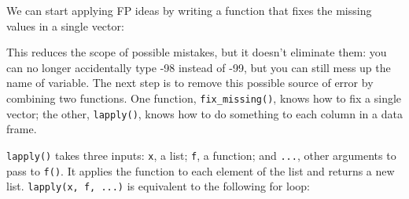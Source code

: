 We can start applying FP ideas by writing a function that fixes the
missing values in a single vector:

\begin{Shaded}
\begin{Highlighting}[]
\StringTok{ }
\NormalTok{  x[x }\OperatorTok{==}\StringTok{ }\NormalTok{] <-}\StringTok{ }
\NormalTok{\}}
\OperatorTok{$}\StringTok{ }\OperatorTok{$}
\OperatorTok{$}\StringTok{ }\OperatorTok{$}
\OperatorTok{$}\StringTok{ }\OperatorTok{$}
\OperatorTok{$}\StringTok{ }\OperatorTok{$}
\OperatorTok{$}\StringTok{ }\OperatorTok{$}
\OperatorTok{$}\StringTok{ }\OperatorTok{$}
\end{Highlighting}
\end{Shaded}

This reduces the scope of possible mistakes, but it doesn't eliminate
them: you can no longer accidentally type -98 instead of -99, but you
can still mess up the name of variable. The next step is to remove this
possible source of error by combining two functions. One function,
\texttt{fix\_missing()}, knows how to fix a single vector; the other,
\texttt{lapply()}, knows how to do something to each column in a data
frame.

\texttt{lapply()} takes three inputs: \texttt{x}, a list; \texttt{f}, a
function; and \texttt{...}, other arguments to pass to \texttt{f()}. It
applies the function to each element of the list and returns a new list.
\texttt{lapply(x,\ f,\ ...)} is equivalent to the following for loop:

\begin{Shaded}
\begin{Highlighting}[]
\StringTok{ }\NormalTok{(}\NormalTok{, }
 
\StringTok{ }
\NormalTok{\}}
\end{Highlighting}
\end{Shaded}

